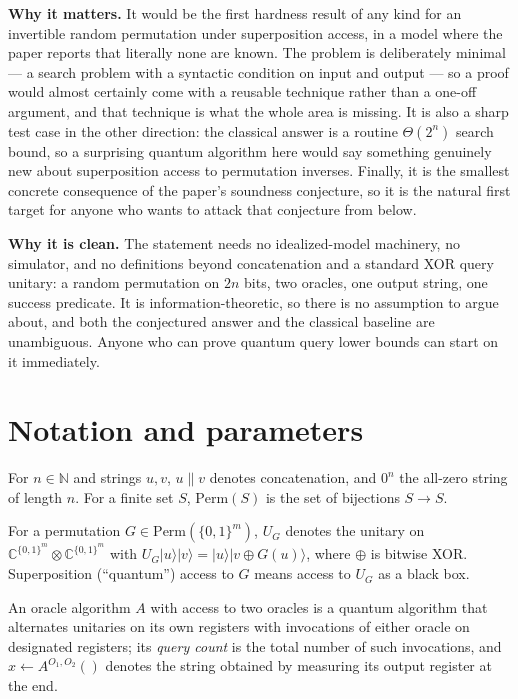 \documentclass{aicr-conjecture}
\newcommand{\ket}[1]{|#1\rangle}
\newcommand{\Perm}{\mathrm{Perm}}
\newcommand{\CC}{\mathbb{C}}
\newcommand{\NN}{\mathbb{N}}
\newcommand{\bits}{\{0,1\}}
\begin{document}
\textbf{Why it matters.} It would be the first hardness result of any
kind for an invertible random permutation under superposition access,
in a model where the paper reports that literally none are known. The
problem is deliberately minimal --- a search problem with a syntactic
condition on input and output --- so a proof would almost certainly
come with a reusable technique rather than a one-off argument, and
that technique is what the whole area is missing. It is also a sharp
test case in the other direction: the classical answer is a routine
$\Theta(2^n)$ search bound, so a surprising quantum algorithm here
would say something genuinely new about superposition access to
permutation inverses. Finally, it is the smallest concrete consequence
of the paper's soundness conjecture, so it is the natural first target
for anyone who wants to attack that conjecture from below.

\textbf{Why it is clean.} The statement needs no idealized-model
machinery, no simulator, and no definitions beyond concatenation and a
standard XOR query unitary: a random permutation on $2n$ bits, two
oracles, one output string, one success predicate. It is
information-theoretic, so there is no assumption to argue about, and
both the conjectured answer and the classical baseline are
unambiguous. Anyone who can prove quantum query lower bounds can start
on it immediately.

\section{Notation and parameters}\label{sec:notation}

For $n \in \NN$ and strings $u, v$, $u \| v$ denotes concatenation,
and $0^n$ the all-zero string of length $n$. For a finite set $S$,
$\Perm(S)$ is the set of bijections $S \to S$.

For a permutation $G \in \Perm(\bits^{m})$, $U_G$ denotes the unitary
on $\CC^{\bits^m} \otimes \CC^{\bits^m}$ with
$U_G \ket{u} \ket{v} = \ket{u} \ket{v \oplus G(u)}$, where $\oplus$ is
bitwise XOR. Superposition (``quantum'') access to $G$ means access to
$U_G$ as a black box.

An oracle algorithm $A$ with access to two oracles is a quantum
algorithm that alternates unitaries on its own registers with
invocations of either oracle on designated registers; its \emph{query
count} is the total number of such invocations, and
$x \leftarrow A^{O_1,O_2}()$ denotes the string obtained by measuring
its output register at the end.
\end{document}

